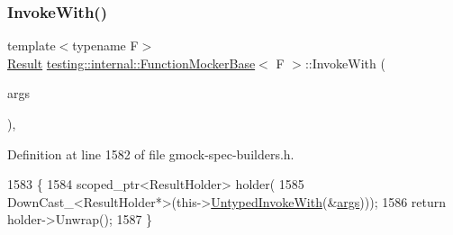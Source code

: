 \mbox{\label{classtesting_1_1internal_1_1FunctionMockerBase_a869ec713f000b4e7829c660efc25e8cd}} 
\subsubsection{\texorpdfstring{Invoke\+With()}{InvokeWith()}}
{\footnotesize\ttfamily template$<$typename F$>$ \\
\hyperlink{classtesting_1_1internal_1_1FunctionMockerBase_aa50abc4055b4d3a14ad64c317bccec8d}{Result} \hyperlink{classtesting_1_1internal_1_1FunctionMockerBase}{testing\+::internal\+::\+Function\+Mocker\+Base}$<$ F $>$\+::Invoke\+With (\begin{DoxyParamCaption}\item[{const \hyperlink{classtesting_1_1internal_1_1FunctionMockerBase_a336432a07e544af4ffb8103603471ca3}{Argument\+Tuple} \&}]{args }\end{DoxyParamCaption})\hspace{0.3cm}{\ttfamily [inline]}, {\ttfamily [protected]}}



Definition at line 1582 of file gmock-\/spec-\/builders.\+h.


\begin{DoxyCode}
1583                                             \{
1584     scoped\_ptr<ResultHolder> holder(
1585         DownCast\_<ResultHolder*>(this->\hyperlink{classtesting_1_1internal_1_1UntypedFunctionMockerBase_adaec41c0ba8a07c2415f6c8efa0ca54f}{UntypedInvokeWith}(&\hyperlink{namespacegenerate__debs_a75f9143e38df82d83b2e8a6f99cae02c}{args})));
1586     \textcolor{keywordflow}{return} holder->Unwrap();
1587   \}
\end{DoxyCode}
\mbox{\label{classtesting_1_1internal_1_1FunctionMockerBase_adbef6e1af840c9c14c3a6acee01007b2}} 
